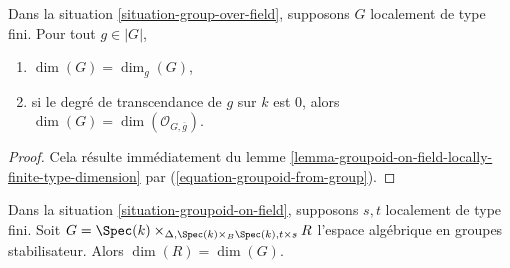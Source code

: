 \begin{lemma}
\label{lemma-group-over-field-locally-finite-type-dimension}
Dans la
situation \ref{situation-group-over-field},
supposons $G$ localement de type fini.
Pour tout $g \in |G|$,
\begin{enumerate}
\item $\dim(G) = \dim_g(G)$,
\item si le degré de transcendance de $g$ sur $k$ est $0$, alors
$\dim(G) = \dim(\mathcal{O}_{G, \overline{g}})$.
\end{enumerate}
\end{lemma}

\begin{proof}
Cela résulte immédiatement du
lemme \ref{lemma-groupoid-on-field-locally-finite-type-dimension}
par (\ref{equation-groupoid-from-group}).
\end{proof}

\begin{lemma}
\label{lemma-groupoid-on-field-dimension-equal-stabilizer}
Dans la
situation \ref{situation-groupoid-on-field},
supposons $s, t$ localement de type fini.
Soit
$G = \Spec(k)
\times_{\Delta, \Spec(k) \times_B \Spec(k), t \times s} R$
l'espace algébrique en groupes stabilisateur.
Alors $\dim(R) = \dim(G)$.
\end{lemma}


